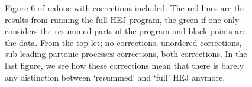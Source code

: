 \begin{figure}[t]
\caption{Figure 6 of \cite{Aad2011} redone with corrections included. The red lines are the results from running the full HEJ program, the green if one only considers the resummed parts of the program and black points are the data. From the top let; no corrections, unordered corrections, sub-leading partonic processes corrections, both corrections. In the last figure, we see how these corrections mean that there is barely any distinction between `resummed' and `full' HEJ anymore.}
\label{fig:veto}
\end{figure}

\begin{figure}[t]
\centering
{}

\end{figure}
